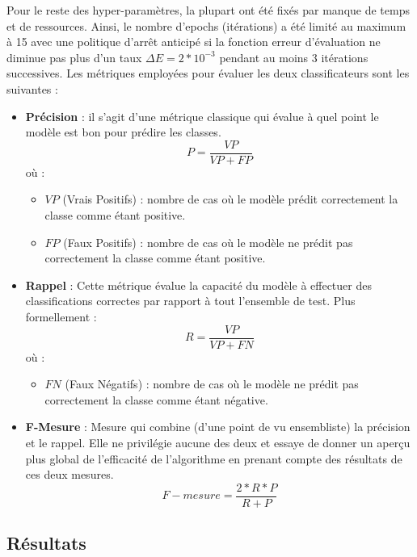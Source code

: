 	\par
	Pour le reste des hyper-paramètres, la plupart ont été fixés par manque de temps et de ressources. Ainsi, le nombre d'epochs (itérations) a été limité au maximum à 15 avec une politique d'arrêt anticipé si la fonction erreur d'évaluation ne diminue pas plus d'un taux $\Delta E = 2*10^{-3}$ pendant au moins 3 itérations successives. Les métriques employées pour évaluer les deux classificateurs sont les suivantes : 
	\begin{itemize}
		\item \textbf{Précision} : il s'agit d'une métrique classique qui évalue à quel point le modèle est bon pour prédire les classes.
		\begin{equation*}
			P = \frac{VP}{VP+FP}
		\end{equation*}
		où : 
		\begin{itemize}
			\item $VP$ (Vrais Positifs) : nombre de cas où le modèle prédit correctement la classe comme étant positive.
			\item $FP$ (Faux Positifs) : nombre de cas où le modèle ne prédit pas correctement la classe comme étant positive.
		\end{itemize}

		\item \textbf{Rappel} : Cette métrique évalue la capacité du modèle à effectuer des classifications correctes par rapport à tout l'ensemble de test. Plus formellement : 
		\begin{equation*}
		R = \frac{VP}{VP+FN}
		\end{equation*}
		où : 
		\begin{itemize}
			\item $FN$ (Faux Négatifs) : nombre de cas où le modèle ne prédit pas correctement la classe comme étant négative.
		\end{itemize}
	
		\item \textbf{F-Mesure} : Mesure qui combine (d'une point de vu ensembliste) la précision et le rappel. Elle ne privilégie aucune des deux et essaye de donner un aperçu plus global de l'efficacité de l'algorithme en prenant compte des résultats de ces deux mesures.
		\begin{equation*}
		F-mesure = \frac{2*R*P}{R+P}
		\end{equation*}
	\end{itemize}
	\subsection{Résultats}
